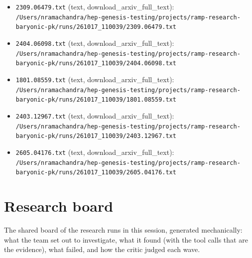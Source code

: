 \documentclass[11pt,a4paper]{article}
\begin{document}
\begin{itemize}
  \item \texttt{2309.06479.txt} (text, download\_arxiv\_full\_text): \texttt{/\allowbreak{}Users/\allowbreak{}nramachandra/\allowbreak{}hep-genesis-testing/\allowbreak{}projects/\allowbreak{}ramp-research-baryonic-pk/\allowbreak{}runs/\allowbreak{}261017\_\allowbreak{}110039/\allowbreak{}2309.06479.txt}
  \item \texttt{2404.06098.txt} (text, download\_arxiv\_full\_text): \texttt{/\allowbreak{}Users/\allowbreak{}nramachandra/\allowbreak{}hep-genesis-testing/\allowbreak{}projects/\allowbreak{}ramp-research-baryonic-pk/\allowbreak{}runs/\allowbreak{}261017\_\allowbreak{}110039/\allowbreak{}2404.06098.txt}
  \item \texttt{1801.08559.txt} (text, download\_arxiv\_full\_text): \texttt{/\allowbreak{}Users/\allowbreak{}nramachandra/\allowbreak{}hep-genesis-testing/\allowbreak{}projects/\allowbreak{}ramp-research-baryonic-pk/\allowbreak{}runs/\allowbreak{}261017\_\allowbreak{}110039/\allowbreak{}1801.08559.txt}
  \item \texttt{2403.12967.txt} (text, download\_arxiv\_full\_text): \texttt{/\allowbreak{}Users/\allowbreak{}nramachandra/\allowbreak{}hep-genesis-testing/\allowbreak{}projects/\allowbreak{}ramp-research-baryonic-pk/\allowbreak{}runs/\allowbreak{}261017\_\allowbreak{}110039/\allowbreak{}2403.12967.txt}
  \item \texttt{2605.04176.txt} (text, download\_arxiv\_full\_text): \texttt{/\allowbreak{}Users/\allowbreak{}nramachandra/\allowbreak{}hep-genesis-testing/\allowbreak{}projects/\allowbreak{}ramp-research-baryonic-pk/\allowbreak{}runs/\allowbreak{}261017\_\allowbreak{}110039/\allowbreak{}2605.04176.txt}
\end{itemize}

\section{Research board}
\label{app:board}
The shared board of the research runs in this session, generated mechanically: what the team set out to investigate, what it found (with the tool calls that are the evidence), what failed, and how the critic judged each wave.
\end{document}
